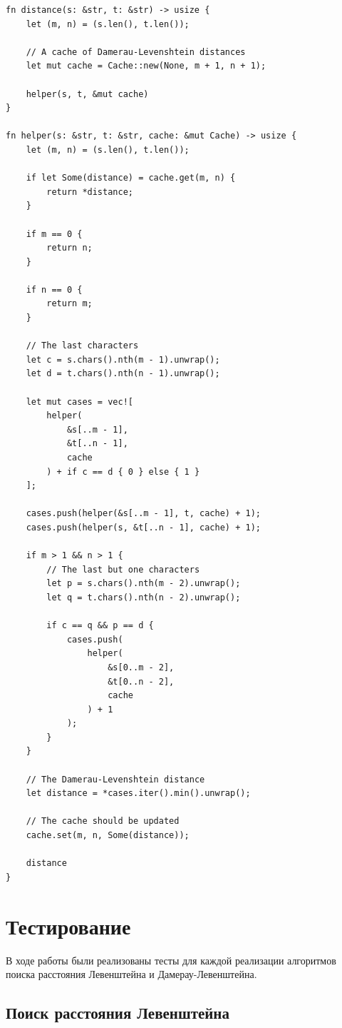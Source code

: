 \documentclass{report}
\begin{document}
\begin{lstlisting}[caption=Реализация рекурсивного алгоритма с кэшем]
fn distance(s: &str, t: &str) -> usize {
    let (m, n) = (s.len(), t.len());

    // A cache of Damerau-Levenshtein distances
    let mut cache = Cache::new(None, m + 1, n + 1);

    helper(s, t, &mut cache)
}

fn helper(s: &str, t: &str, cache: &mut Cache) -> usize {
    let (m, n) = (s.len(), t.len());

    if let Some(distance) = cache.get(m, n) {
        return *distance;
    }

    if m == 0 {
        return n;
    }

    if n == 0 {
        return m;
    }

    // The last characters
    let c = s.chars().nth(m - 1).unwrap();
    let d = t.chars().nth(n - 1).unwrap();

    let mut cases = vec![
        helper(
            &s[..m - 1],
            &t[..n - 1],
            cache
        ) + if c == d { 0 } else { 1 }
    ];

    cases.push(helper(&s[..m - 1], t, cache) + 1);
    cases.push(helper(s, &t[..n - 1], cache) + 1);

    if m > 1 && n > 1 {
        // The last but one characters
        let p = s.chars().nth(m - 2).unwrap();
        let q = t.chars().nth(n - 2).unwrap();

        if c == q && p == d {
            cases.push(
                helper(
                    &s[0..m - 2],
                    &t[0..n - 2],
                    cache
                ) + 1
            );
        }
    }

    // The Damerau-Levenshtein distance
    let distance = *cases.iter().min().unwrap();

    // The cache should be updated
    cache.set(m, n, Some(distance));

    distance
}
\end{lstlisting}

\section{Тестирование}

В ходе работы были реализованы тесты для каждой реализации
алгоритмов поиска расстояния Левенштейна и Дамерау-Левенштейна.

\subsection{Поиск расстояния Левенштейна} \label{test-vl}
\end{document}
